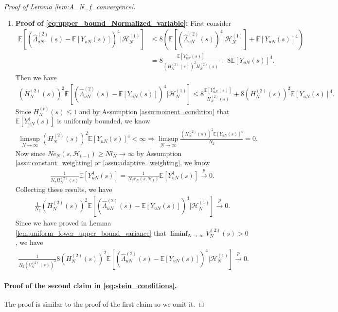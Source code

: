 \documentclass[12pt]{article}
\newcommand{\E}{\mathbb E}								%
\newcommand{\convp}{\overset p \rightarrow}             %
\begin{document}
\begin{proof}[Proof of Lemma \ref{lem:A_N_f_convergence}]
\begin{enumerate}
		\item \textbf{Proof of \eqref{eq:upper_bound_Normalized_variable}:} First consider 
		\begin{align*}
			\E\left[(\hat{\Lambda}_{uN}^{(2)}(s)-\E[Y_{uN}(s)])^4|\mathcal{H}^{(1)}_{N}\right]
			&
			\leq 8\left(\E\left[(\hat{\Lambda}_{uN}^{(2)}(s))^4|\mathcal{H}^{(1)}_{N}\right]+\E[Y_{uN}(s)]^4\right)\\
			&
			=8\frac{\E[Y_{uN}^4(s)]}{(H_N^{(2)}(s))^2H_N^{(2)}(s)}+8\E[Y_{uN}(s)]^4.
		\end{align*}
		Then we have 
		\begin{align*}
			(H_N^{(2)}(s))^2\E\left[(\hat{\Lambda}_{uN}^{(2)}(s)-\E[Y_{uN}(s)])^4|\mathcal{H}^{(1)}_{N}\right]\leq 8\frac{\E[Y_{uN}^4(s)]}{H_N^{(2)}(s)}+8(H_N^{(2)}(s))^2\E[Y_{uN}(s)]^4.
		\end{align*}
		Since $H_N^{(t)}(s)\leq 1$ and by Assumption \ref{assu:moment_condition} that $\E[Y_{uN}^4(s)]$ is uniformly bounded, we know 
		\begin{align*}
			\limsup_{N\rightarrow\infty}(H_N^{(2)}(s))^2\E[Y_{uN}(s)]^4<\infty\Rightarrow \limsup_{N\rightarrow\infty}\frac{(H_N^{(2)}(s))^2\E[Y_{uN}(s)]^4}{N_2}=0.
		\end{align*}
		Now since $N\bar e_N(s,\mathcal{H}_{t-1})\geq Nl_N\rightarrow \infty$ by Assumption \ref{assu:constant_weighting} or \ref{assu:adaptive_weighting}, we know 
		\begin{align*}
			\frac{1}{N_2H_N^{(2)}(s)}\E[Y_{uN}^4(s)]=\frac{1}{N_2\bar e_N(s,\mathcal{H}_1)}\E[Y_{uN}^4(s)]\convp 0.
		\end{align*}
		Collecting these results, we have 
		\begin{align*}
			\frac{1}{N_2}(H_N^{(2)}(s))^2\E\left[(\hat{\Lambda}_{uN}^{(2)}(s)-\E[Y_{uN}(s)])^4|\mathcal{H}_N^{(1)}\right]\convp 0.
		\end{align*}
		Since we have proved in Lemma \ref{lem:uniform_lower_upper_bound_variance} that $\liminf_{N\rightarrow\infty}V_N^{(2)}(s)>0$, we have 
		\begin{align*}
			\frac{1}{N_2(V_N^{(2)}(s))^2}8(H_N^{(2)}(s))^2\E\left[(\hat{\Lambda}_{uN}^{(2)}(s)-\E[Y_{uN}(s)])^4|\mathcal{H}_N^{(1)}\right]\convp 0.
		\end{align*}
	\end{enumerate}
	
	
	\paragraph{Proof of the second claim in \eqref{eq:stein_conditions}.}
	The proof is similar to the proof of the first claim so we omit it.
\end{proof}
\end{document}
